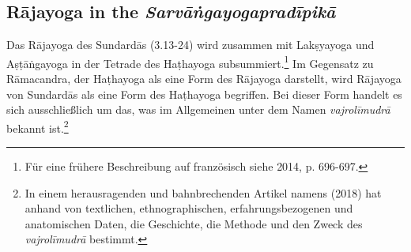 \subsection{Rājayoga in the \emph{Sarvāṅgayogapradīpikā}}

Das Rājayoga des Sundardās (3.13-24) wird zusammen mit Lakṣyayoga und Aṣṭāṅgayoga in der Tetrade des Haṭhayoga subsummiert.\footnote{Für eine frühere Beschreibung auf französisch siehe \citeauthor{burger2014sarvangayogapradipika} 2014, p. 696-697.} Im Gegensatz zu Rāmacandra, der Haṭhayoga als eine Form des Rājayoga darstellt, wird Rājayoga von Sundardās als eine Form des Haṭhayoga begriffen. Bei dieser Form handelt es sich ausschließlich um das, was im Allgemeinen unter dem Namen \textit{vajrolīmudrā} bekannt ist.\footnote{In einem herausragenden und bahnbrechenden Artikel namens  (2018) hat \citeauthor{mallinson2018vajrolimudra} anhand von textlichen, ethnographischen, erfahrungsbezogenen und anatomischen Daten, die Geschichte, die Methode und den Zweck des \textit{vajrolīmudrā} bestimmt.}

